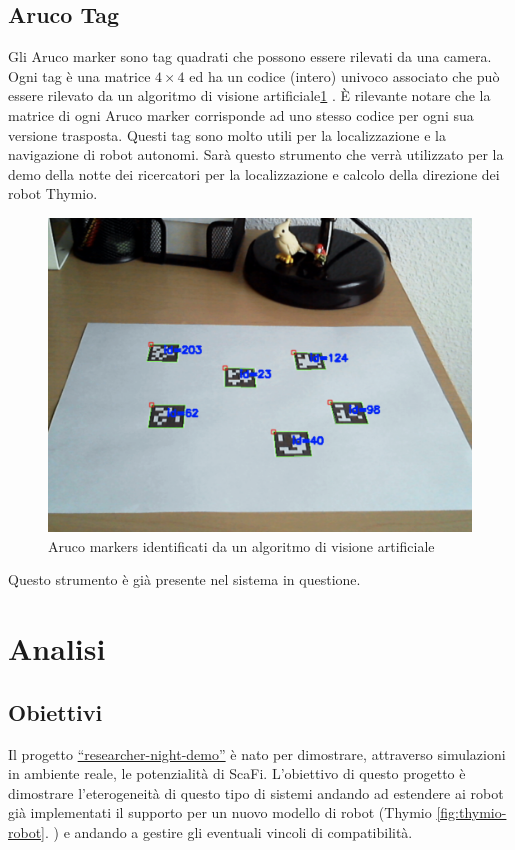 \documentclass[12pt,a4paper,openright,twoside]{book}
\begin{document}
\section{Aruco Tag}

Gli Aruco marker sono tag quadrati che possono essere rilevati da una camera. Ogni tag è una matrice $4 \times 4$ ed ha un codice (intero) univoco associato che può essere rilevato da un algoritmo di visione artificiale\cref{fig:aruco-markers} \cite{opencvOpenCVDetection}. È rilevante notare che la matrice di ogni Aruco marker corrisponde ad uno stesso codice per ogni sua versione trasposta. 
Questi tag sono molto utili per la localizzazione e la navigazione di robot autonomi. Sarà questo strumento che verrà utilizzato per la demo della notte dei ricercatori per la localizzazione e calcolo della direzione dei robot Thymio.

\begin{figure}
    \centering
    \includegraphics[width=.8\linewidth]{figures/aruco-markers.png}
    \caption{Aruco markers identificati da un algoritmo di visione artificiale}
    \label{fig:aruco-markers}
\end{figure}

Questo strumento è già presente nel sistema in questione.

\chapter{Analisi}
\label{chap:analisi}

\section{Obiettivi}
Il progetto \href{https://github.com/cric96/researcher-night-demo.git}{``researcher-night-demo''} è nato per dimostrare, attraverso simulazioni in ambiente reale, le potenzialità di ScaFi. L'obiettivo di questo progetto è dimostrare l'eterogeneità di questo tipo di sistemi andando ad estendere ai robot già implementati il supporto per un nuovo modello di robot (Thymio \cref{fig:thymio-robot}. ) e andando a gestire gli eventuali vincoli di compatibilità.
\end{document}
